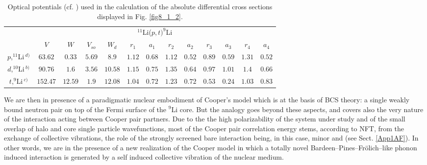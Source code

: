 \begin{table}[h!]
{\begin{tabular}{|c|c|c|c|c|c|c|c|c|c|c|c|c|}
\cline{2-13} 
\multicolumn{1}{c|}{}& \multicolumn{12}{|c|}{$^{11}$Li($p,t)^{9}$Li}           \\
\cline{2-13} 
\multicolumn{1}{c|}{} & $V$ & $W$ &  $V_{so}$ &  $W_d$ &  $r_1$ &  $a_1$ &  $r_2$ &  $a_2$ &  $r_3$ &  $a_3$ &  $r_4$ &  $a_4$            \\
\hline 
$p$,\;$^{11}$Li$\,^{d)}$ & $63.62$ & $0.33$ &  $5.69$ &  $8.9$ &  $1.12$ &  $0.68$ &  $1.12$ &  $0.52$ &  $0.89$ &  $0.59$ &  $1.31$ &  $0.52$ \\
\hline 
$d$,\;$^{10}$Li$\,^{b)}$ & $90.76$ & $1.6$ &  $3.56$ &  $10.58$ &  $1.15$ &  $0.75$ &  $1.35$ &  $0.64$ &  $0.97$ &  $1.01$ &  $1.4$ &  $0.66$ \\
\hline 
$t$,\;$^{9}$Li$\,^{c)}$ & $152.47$ & $12.59$ &  $1.9$ &  $12.08$ &  $1.04$ &  $0.72$ &  $1.23$ &  $0.72$ &  $0.53$ &  $0.24$ &  $1.03$ &  $0.83$ \\
\hline 

\hline 
  \end{tabular}}
   \caption{Optical potentials (cf. \cite{Tanihata:08}) used in the calculation of the absolute differential cross sections displayed in Fig. \ref{fig8_1_2}.}
\label{tab8.1.1}
\end{table}


We are then in presence of a paradigmatic nuclear embodiment of Cooper's model which is at the basis of BCS theory: a single weakly bound neutron pair on top of the Fermi surface of the ${}^9$Li core. But the analogy goes beyond these aspects, and covers also the very nature of the interaction acting between Cooper pair partners. Due to the  the high polarizability of the system under study and of the small overlap of halo and core single particle wavefunctions, most of the Cooper pair correlation energy stems, according to NFT, from the exchange of collective vibrations, the role of the strongly screened bare interaction being, in this case, minor and  (see Sect. \ref{App1AF}). In other words, we are in the presence of a new realization of the Cooper model in which a totally novel Bardeen--Pines--Fr\"olich--like phonon induced interaction is generated by a self induced collective vibration of the nuclear medium.



